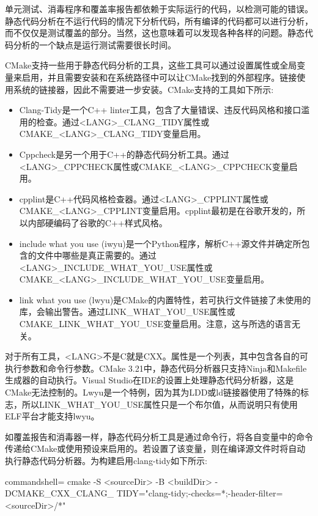 单元测试、消毒程序和覆盖率报告都依赖于实际运行的代码，以检测可能的错误。静态代码分析在不运行代码的情况下分析代码，所有编译的代码都可以进行分析，而不仅仅是测试覆盖的部分。当然，这也意味着可以发现各种各样的问题。静态代码分析的一个缺点是运行测试需要很长时间。

CMake支持一些用于静态代码分析的工具，这些工具可以通过设置属性或全局变量来启用，并且需要安装和在系统路径中可以让CMake找到的外部程序。链接使用系统的链接器，因此不需要进一步安装。CMake支持的工具如下所示:

\begin{itemize}
\item 
Clang-Tidy是一个C++ linter工具，包含了大量错误、违反代码风格和接口滥用的检查。通过<LANG>\_CLANG\_TIDY属性或CMAKE\_<LANG>\_CLANG\_TIDY变量启用。

\item 
Cppcheck是另一个用于C++的静态代码分析工具。通过<LANG>\_CPPCHECK属性或CMAKE\_<LANG>\_CPPCHECK变量启用。

\item 
cpplint是C++代码风格检查器。通过<LANG>\_CPPLINT属性或CMAKE\_<LANG>\_CPPLINT变量启用。cpplint最初是在谷歌开发的，所以内部硬编码了谷歌的C++样式风格。

\item 
include what you use (iwyu)是一个Python程序，解析C++源文件并确定所包含的文件中哪些是真正需要的。通过<LANG>\_INCLUDE\_WHAT\_YOU\_USE属性或CMAKE\_<LANG>\_INCLUDE\_WHAT\_YOU\_USE变量启用。

\item 
link what you use (lwyu)是CMake的内置特性，若可执行文件链接了未使用的库，会输出警告。通过LINK\_WHAT\_YOU\_USE属性或CMAKE\_LINK\_WHAT\_YOU\_USE变量启用。注意，这与所选的语言无关。
\end{itemize}

对于所有工具，<LANG>不是C就是CXX。属性是一个列表，其中包含各自的可执行参数和命令行参数。CMake 3.21中，静态代码分析器只支持Ninja和Makefile生成器的自动执行。Visual Studio在IDE的设置上处理静态代码分析器，这是CMake无法控制的。Lwyu是一个特例，因为其为LDD或ld链接器使用了特殊的标志，所以LINK\_WHAT\_YOU\_USE属性只是一个布尔值，从而说明只有使用ELF平台才能支持lwyu。

如覆盖报告和消毒器一样，静态代码分析工具是通过命令行，将各自变量中的命令传递给CMake或使用预设来启用的。若设置了该变量，则在编译源文件时将自动执行静态代码分析器。为构建启用clang-tidy如下所示:

\begin{tcblisting}{commandshell={}}
cmake -S <sourceDir> -B <buildDir> -DCMAKE_CXX_CLANG_
  TIDY="clang-tidy;-checks=*;-header-filter=<sourceDir>/*"
\end{tcblisting}

